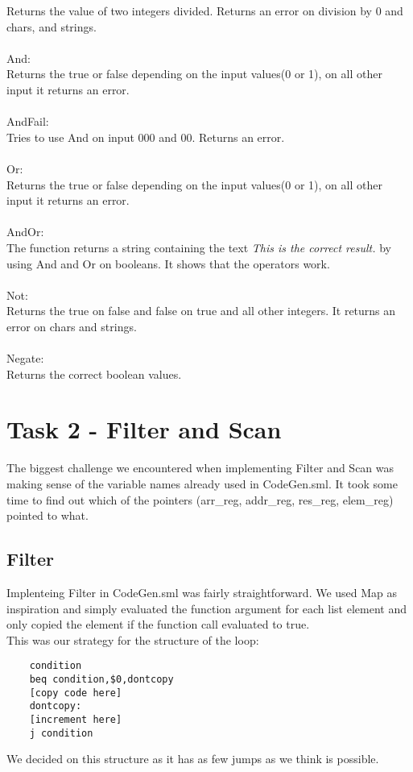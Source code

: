\documentclass{article}
\begin{document}
Returns the value of two integers divided. Returns an error on division by 0 and chars, and strings.\\
\\
And:\\
Returns the true or false depending on the input values(0 or 1), on all other input it returns an error.\\
\\
AndFail:\\
Tries to use And on input 000 and 00. Returns an error.\\
\\
Or:\\
Returns the true or false depending on the input values(0 or 1), on all other input it returns an error.\\
\\
AndOr:\\
The function returns a string containing the text \textit{This is the correct result.} by using And and Or on booleans. It shows that the operators work.\\
\\
Not:\\
Returns the true on false and false on true and all other integers. It returns an error on chars and strings.\\
\\
Negate:\\
Returns the correct boolean values.

\newpage

\section{Task 2 - Filter and Scan}

The biggest challenge we encountered when implementing Filter and Scan was making sense of the variable names already used in CodeGen.sml. It took some time to find out which of the pointers (arr\_reg, addr\_reg, res\_reg, elem\_reg) pointed to what.

\subsection{Filter}
Implenteing Filter in CodeGen.sml was fairly straightforward. We used Map as inspiration and simply evaluated the function argument for each list element and only copied the element if the function call evaluated to true.\\

\noindent This was our strategy for the structure of the loop:
\begin{verbatim}
    condition
    beq condition,$0,dontcopy
    [copy code here]
    dontcopy:
    [increment here]
    j condition
\end{verbatim}
We decided on this structure as it has as few jumps as we think is possible.
\end{document}
